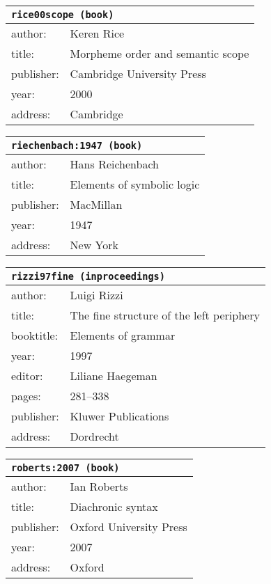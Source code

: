 \documentclass{article}
\begin{document}
\bigskip

\begin{tabular}{p{}p{}}
\multicolumn{2}{l}{\texttt{rice00scope (book)}}\\
\hline
author: & Keren Rice\\
title: & Morpheme order and semantic scope\\
publisher: & Cambridge University Press\\
year: & 2000\\
address: & Cambridge\\
\end{tabular}

\bigskip

\begin{tabular}{p{}p{}}
\multicolumn{2}{l}{\texttt{riechenbach:1947 (book)}}\\
\hline
author: & Hans Reichenbach\\
title: & Elements of symbolic logic\\
publisher: & MacMillan\\
year: & 1947\\
address: & New York\\
\end{tabular}

\bigskip

\begin{tabular}{p{}p{}}
\multicolumn{2}{l}{\texttt{rizzi97fine (inproceedings)}}\\
\hline
author: & Luigi Rizzi\\
title: & The fine structure of the left periphery\\
booktitle: & Elements of grammar\\
year: & 1997\\
editor: & Liliane Haegeman\\
pages: & 281--338\\
publisher: & Kluwer Publications\\
address: & Dordrecht\\
\end{tabular}

\bigskip

\begin{tabular}{p{}p{}}
\multicolumn{2}{l}{\texttt{roberts:2007 (book)}}\\
\hline
author: & Ian Roberts\\
title: & Diachronic syntax\\
publisher: & Oxford University Press\\
year: & 2007\\
address: & Oxford\\
\end{tabular}
\end{document}
